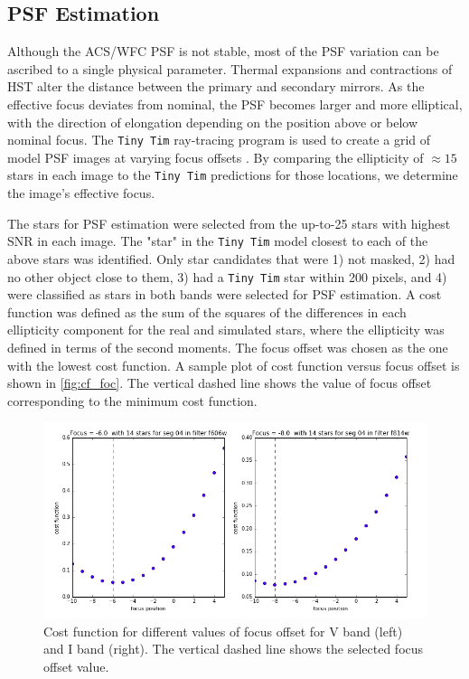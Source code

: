 \documentclass[a4paper,11pt]{article}
\begin{document}
\subsection{PSF Estimation}
\label{ssec:psf}
Although the ACS/WFC PSF is not stable, most of the PSF variation can be ascribed to a single physical parameter. Thermal expansions and contractions of HST alter the distance between the primary and secondary mirrors. As the effective focus deviates from nominal, the PSF becomes larger and more elliptical, with the direction of elongation depending on the position above or below nominal focus. The {\tt Tiny Tim} ray-tracing program is used to create a grid of model PSF images at varying focus offsets \citep{Rhodes}. By comparing the ellipticity of $\approx 15$ stars in each image to the {\tt Tiny Tim} predictions for those locations, we determine the image's effective focus. 

The stars for PSF estimation were selected from the up-to-25 stars with highest SNR in each image. The "star" in the {\tt Tiny Tim} model closest to each of the above stars was identified. Only star candidates that were 1) not masked, 2) had no other object close to them, 3) had a {\tt Tiny Tim} star within 200 pixels, and 4) were classified as stars in both bands were selected for PSF estimation. A cost function was defined as the sum of the squares of the differences in each ellipticity component for the real and simulated stars, where the ellipticity was defined in terms of the second moments. 
The focus offset was chosen as the one with the lowest cost function. 
A sample plot of cost function versus focus offset is shown in \autoref{fig:cf_foc}. 
The vertical dashed line shows the value of focus offset corresponding to the minimum cost function.

\begin{figure}[h]
\centering\includegraphics[width=0.8\linewidth]{cf_foc_04.png}
\caption{Cost function for different values of focus offset for V band (left) and I band (right). The vertical dashed line shows the selected focus offset value.}
\label{fig:cf_foc}
\end{figure}
\end{document}
